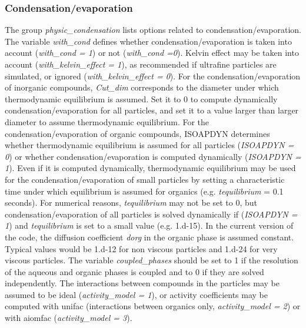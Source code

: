 \documentclass[a4paper,11pt]{article}
\begin{document}
\subsubsection{Condensation/evaporation}

The group {\textit{physic\_condensation}} lists options related to condensation/evaporation. The variable {\textit{with\_cond}} defines whether condensation/evaporation is taken into account ({\textit{with\_cond = 1}}) or not ({\textit{with\_cond =0}}). Kelvin effect may be taken into account ({\textit{with\_kelvin\_effect = 1}}), as recommended if ultrafine particles are simulated, or ignored ({\textit{with\_kelvin\_effect = 0}}).
For the condensation/evaporation of inorganic compounds, {\textit{Cut\_dim}} corresponds to the diameter under which thermodynamic equilibrium is assumed. Set it to 0 to compute dynamically condensation/evaporation for all particles, and set it to a value larger than larger diameter to assume thermodynamic equilibrium.
For the condensation/evaporation of organic compounds, ISOAPDYN determines whether thermodynamic equilibrium is assumed for all particles ({\textit{ISOAPDYN = 0}}) or whether condensation/evaporation is computed dynamically ({\textit{ISOAPDYN = 1}}). Even if it is computed dynamically, thermodynamic equilibrium may be used for the condensation/evaporation of small particles by setting a characteristic time under which equilibrium is assumed for organics (e.g. {\textit{tequilibrium}} = 0.1 seconds). For numerical reasons, {\textit{tequilibrium}} may not be set to 0, but condensation/evaporation of all particles is solved dynamically if ({\textit{ISOAPDYN = 1}}) and {\textit{tequilibrium}} is set to a small value (e.g. 1.d-15). In the current version of the code, the diffusion coefficient {\textit{dorg}} in the organic phase is assumed constant. Typical values would be 1.d-12 for non viscous particles and 1.d-24 for very viscous particles. 
The variable {\textit{coupled\_phases}} should be set to 1 if the resolution of the aqueous and organic phases is coupled and to 0 if they are solved independently. The interactions between compounds in the particles may be assumed to be ideal ({\textit{activity\_model = 1}}), or activity coefficients may be computed with unifac (interactions between organics only, {\textit{activity\_model = 2}}) or with aiomfac ({\textit{activity\_model = 3}}).
\end{document}
